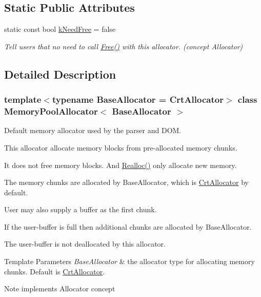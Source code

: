 \subsection*{Static Public Attributes}
\begin{DoxyCompactItemize}
\item 
\mbox{\label{a01984_ab4c7c5c631e451689bc9da392a65194f}} 
static const bool \hyperlink{a01984_ab4c7c5c631e451689bc9da392a65194f}{k\+Need\+Free} = false
\begin{DoxyCompactList}\small\item\em Tell users that no need to call \hyperlink{a01984_a6b180eb150451b4df8b70d827cd1191c}{Free()} with this allocator. (concept Allocator) \end{DoxyCompactList}\end{DoxyCompactItemize}


\subsection{Detailed Description}
\subsubsection*{template$<$typename Base\+Allocator = Crt\+Allocator$>$\newline
class Memory\+Pool\+Allocator$<$ Base\+Allocator $>$}

Default memory allocator used by the parser and D\+OM. 

This allocator allocate memory blocks from pre-\/allocated memory chunks.

It does not free memory blocks. And \hyperlink{a01984_aba75280d42184b0ad414243f7f5ac6c7}{Realloc()} only allocate new memory.

The memory chunks are allocated by Base\+Allocator, which is \hyperlink{a01980}{Crt\+Allocator} by default.

User may also supply a buffer as the first chunk.

If the user-\/buffer is full then additional chunks are allocated by Base\+Allocator.

The user-\/buffer is not deallocated by this allocator.


\begin{DoxyTemplParams}{Template Parameters}
{\em Base\+Allocator} & the allocator type for allocating memory chunks. Default is \hyperlink{a01980}{Crt\+Allocator}. \\
\hline
\end{DoxyTemplParams}
\begin{DoxyNote}{Note}
implements Allocator concept 
\end{DoxyNote}


